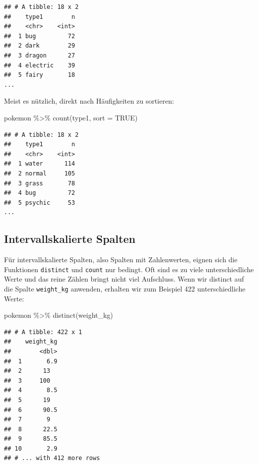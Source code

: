 \documentclass[
]{book}
\newenvironment{Shaded}{\begin{snugshade}}{\end{snugshade}}
\newcommand{\AttributeTok}[1]{\textcolor[rgb]{0.77,0.63,0.00}{#1}}
\newcommand{\ConstantTok}[1]{\textcolor[rgb]{0.00,0.00,0.00}{#1}}
\newcommand{\FunctionTok}[1]{\textcolor[rgb]{0.00,0.00,0.00}{#1}}
\newcommand{\NormalTok}[1]{#1}
\newcommand{\SpecialCharTok}[1]{\textcolor[rgb]{0.00,0.00,0.00}{#1}}
\begin{document}
\begin{verbatim}
## # A tibble: 18 x 2
##    type1        n
##    <chr>    <int>
##  1 bug         72
##  2 dark        29
##  3 dragon      27
##  4 electric    39
##  5 fairy       18
...
\end{verbatim}

Meist es nützlich, direkt nach Häufigkeiten zu sortieren:

\begin{Shaded}
\begin{Highlighting}[]
\NormalTok{pokemon }\SpecialCharTok{\%\textgreater{}\%} 
  \FunctionTok{count}\NormalTok{(type1, }\AttributeTok{sort =} \ConstantTok{TRUE}\NormalTok{)}
\end{Highlighting}
\end{Shaded}

\begin{verbatim}
## # A tibble: 18 x 2
##    type1        n
##    <chr>    <int>
##  1 water      114
##  2 normal     105
##  3 grass       78
##  4 bug         72
##  5 psychic     53
...
\end{verbatim}

\hypertarget{wertebereich-intervallskaliert}{%
\subsection{Intervallskalierte Spalten}\label{wertebereich-intervallskaliert}}

Für intervallskalierte Spalten, also Spalten mit Zahlenwerten, eignen sich die Funktionen \texttt{distinct} und \texttt{count} nur bedingt. Oft sind es zu viele unterschiedliche Werte und das reine Zählen bringt nicht viel Aufschluss. Wenn wir distinct auf die Spalte \texttt{weight\_kg} anwenden, erhalten wir zum Beispiel 422 unterschiedliche Werte:

\begin{Shaded}
\begin{Highlighting}[]
\NormalTok{pokemon }\SpecialCharTok{\%\textgreater{}\%}
  \FunctionTok{distinct}\NormalTok{(weight\_kg)}
\end{Highlighting}
\end{Shaded}

\begin{verbatim}
## # A tibble: 422 x 1
##    weight_kg
##        <dbl>
##  1       6.9
##  2      13  
##  3     100  
##  4       8.5
##  5      19  
##  6      90.5
##  7       9  
##  8      22.5
##  9      85.5
## 10       2.9
## # ... with 412 more rows
\end{verbatim}
\end{document}
